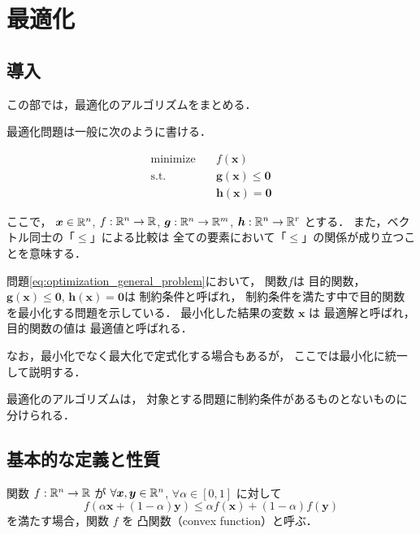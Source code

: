 %

\part{最適化}\label{part:optimization}

\chapter{導入}

この部では，最適化のアルゴリズムをまとめる．

最適化問題は一般に次のように書ける．

\begin{align}\label{eq:optimization_general_problem}
    \text{minimize} \hspace{1em} & f(\bm{x})                 \\
    \text{s.t.} \hspace{1em}     & \bm{g}(\bm{x}) \le \bm{0} \\
                                 & \bm{h}(\bm{x}) = \bm{0}
\end{align}

ここで，
$\bm{x} \in \mathbb{R}^n$,
$f : \mathbb{R}^n \to \mathbb{R}$,
$\bm{g} : \mathbb{R}^n \to \mathbb{R}^m$,
$\bm{h} : \mathbb{R}^n \to \mathbb{R}^r$
とする．
また，ベクトル同士の「$\le$」による比較は
全ての要素において「$\le$」の関係が成り立つことを意味する．

問題\eqref{eq:optimization_general_problem}において，
関数$f$は  目的関数，
$\bm{g}(\bm{x}) \le \bm{0}$, $\bm{h}(\bm{x}) = \bm{0}$は
 制約条件と呼ばれ，
制約条件を満たす中で目的関数を最小化する問題を示している．
最小化した結果の変数 $\bm{x}$ は  最適解と呼ばれ，
目的関数の値は  最適値と呼ばれる．

なお，最小化でなく最大化で定式化する場合もあるが，
ここでは最小化に統一して説明する．

最適化のアルゴリズムは，
対象とする問題に制約条件があるものとないものに分けられる．

\chapter{基本的な定義と性質}

\begin{definition}
    関数 $f : \mathbb{R}^n \to \mathbb{R}$ が
    $\forall \bm{x}, \bm{y} \in \mathbb{R}^n$, $\forall \alpha \in [0, 1]$ に対して
    \begin{equation}
        f\left(\alpha \bm{x} + (1-\alpha) \bm{y}\right)
        \le \alpha f(\bm{x}) + (1-\alpha) f(\bm{y})
    \end{equation}
    を満たす場合，関数 $f$ を  凸関数（convex function）と呼ぶ．
\end{definition}


